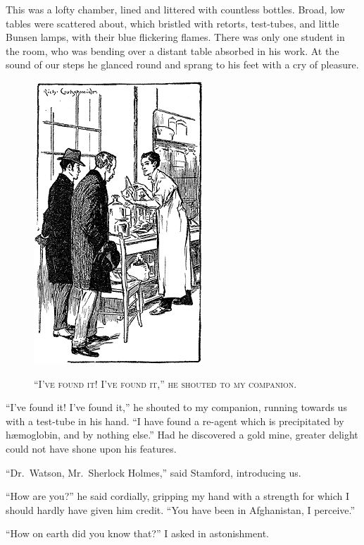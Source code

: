 \documentclass[12pt,english,oneside]{book}
\newcommand{\noun}[1]{\textsc{#1}}
\begin{document}
This was a lofty chamber, lined and littered with countless bottles.
Broad, low tables were scattered about, which bristled with retorts,
test-tubes, and little Bunsen lamps, with their blue flickering flames.
There was only one student in the room, who was bending over a distant
table absorbed in his work. At the sound of our steps he glanced round
and sprang to his feet with a cry of pleasure. %
\begin{figure}[htbp]
\noindent \begin{center}\includegraphics{images/study10-stud-02.png}\end{center}

\noindent \begin{center}\noun{{}``I've found it! I've found it,''
he shouted to my companion.}\end{center}
\end{figure}
{}``I've found it! I've found it,'' he shouted to my companion,
running towards us with a test-tube in his hand. {}``I have found
a re-agent which is precipitated by h\ae moglobin, and by nothing
else.'' Had he discovered a gold mine, greater delight could not
have shone upon his features.

{}``Dr.\ Watson, Mr.\ Sherlock Holmes,'' said Stamford, introducing
us.

{}``How are you?'' he said cordially, gripping my hand with a strength
for which I should hardly have given him credit. {}``You have been
in Afghanistan, I perceive.''

{}``How on earth did you know that?'' I asked in astonishment.
\end{document}
